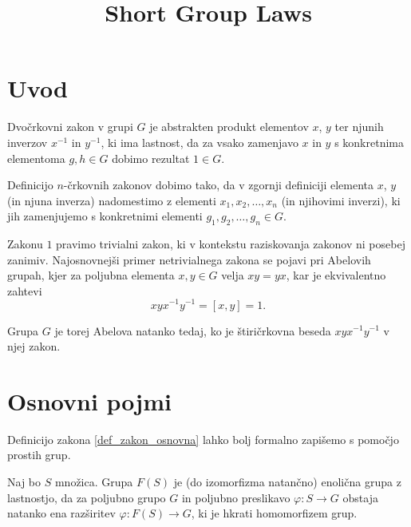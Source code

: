 \documentclass[mat1, tisk]{fmfdelo}
\title{Short Group Laws}
\numberwithin{equation}{section}  %
\begin{document}
\section{Uvod}




Dvočrkovni zakon v grupi $G$ je abstrakten produkt elementov $x$, $y$ ter njunih inverzov $x^{-1}$ in $y^{-1}$, ki ima lastnost, da za vsako zamenjavo $x$ in $y$ s konkretnima
elementoma $g, h \in G$ dobimo rezultat $1 \in G$.

\begin{opomba}
Definicijo $n$-črkovnih zakonov dobimo tako, da v zgornji definiciji elementa $x$, $y$ (in njuna inverza) nadomestimo z elementi $x_1, x_2, \ldots, x_n$ (in njihovimi inverzi),
ki jih zamenjujemo s konkretnimi elementi $g_1, g_2, \ldots, g_{n} \in G$.
\end{opomba}

\noindent
Zakonu $1$ pravimo trivialni zakon, ki v kontekstu raziskovanja zakonov ni posebej zanimiv. Najosnovnejši primer netrivialnega zakona se pojavi pri Abelovih grupah, kjer za poljubna elementa $x,y \in  G$ velja $xy = yx$, kar je ekvivalentno
zahtevi \begin{equation*}
xyx^{-1}y^{-1} = [x,y] = 1.
\end{equation*}

\noindent
Grupa $G$ je torej Abelova natanko tedaj, ko je štiričrkovna beseda $xyx^{-1}y^{-1}$ v njej zakon. 


\section{Osnovni pojmi}

Definicijo zakona \ref{def_zakon_osnovna} lahko bolj formalno zapišemo s pomočjo prostih grup.

\begin{definicija}
\label{def_prosta_grupa}
Naj bo $S$ množica. Grupa $F(S)$ je (do izomorfizma natančno) enolična grupa z lastnostjo, da za poljubno grupo $G$ in poljubno preslikavo
$\varphi: S \to G$ obstaja natanko ena razširitev $\varphi: F(S) \to G$, ki je hkrati homomorfizem grup. 
\end{definicija}
\end{document}
